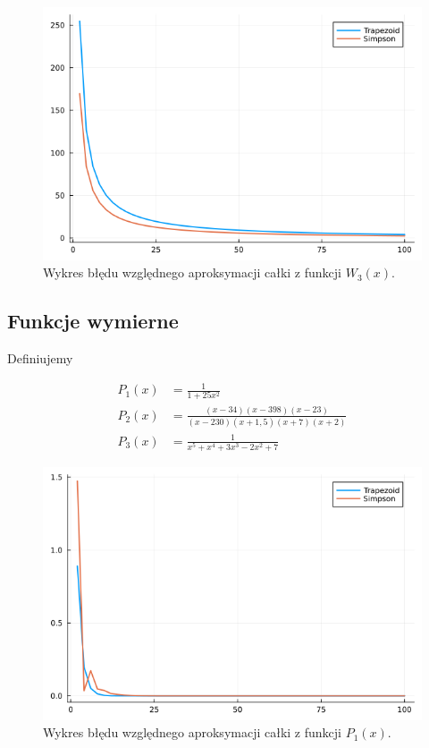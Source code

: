 \documentclass{article}
\theoremstyle{definition}
\begin{document}
\begin{figure}[h!]
    \centering
    \includegraphics[scale=0.5]{plot_W3.png}
    \caption{Wykres błędu względnego aproksymacji całki z funkcji \(W_3(x)\).}
    \label{fig:plot_W3}
\end{figure}

\clearpage

\subsection{Funkcje wymierne}

Definiujemy

\begin{align*}
    P_1(x) &= \frac{1}{1+25x^2} \\
    P_2(x) &= \frac{(x-34)(x-398)(x-23)}{(x-230)(x+1,5)(x+7)(x+2)} \\
    P_3(x) &= \frac{1}{x^5 + x^4 + 3x^3 - 2x^2+7}
\end{align*}


\begin{figure}[h!]
    \centering
    \includegraphics[scale=0.5]{plot_P1.png}
    \caption{Wykres błędu względnego aproksymacji całki z funkcji \(P_1(x)\).}
    \label{fig:plot_P1}
\end{figure}
\end{document}
